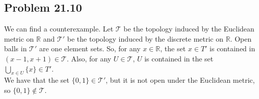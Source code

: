 \documentclass{article}
\newcommand{\R}{\mathbb{R}}
\newcommand{\T}{\mathcal{T}}
\begin{document}
\subsection*{Problem 21.10}
We can find a counterexample. Let $\T$ be the topology induced by the Euclidean metric on $\R$ and $\T'$ be the topology induced by the discrete metric on $\R$. Open balls in $\T'$ are one element sets. So, for any $x \in \R$, the set ${x} \in T'$ is contained in $(x - 1, x + 1) \in \T$. Also, for any $U \in \T$, $U$ is contained in the set $\bigcup_{x \in U} \{x\} \in T'$. \\

We have that the set $\{0, 1\} \in \T'$, but it is not open under the Euclidean metric, so $\{0, 1\} \not\in \T$.
\end{document}
